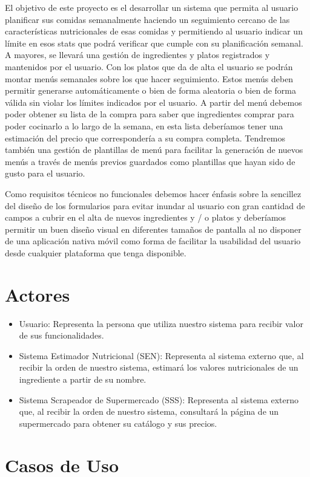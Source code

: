 \documentclass[12pt, a4paper, twoside]{book}
\begin{document}
	El objetivo de este proyecto es el desarrollar un sistema que permita al usuario planificar sus comidas semanalmente haciendo un seguimiento cercano de las características nutricionales de esas comidas y permitiendo al usuario indicar un límite en esos stats que podrá verificar que cumple con su planificación semanal.
	A mayores, se llevará una gestión de ingredientes y platos registrados y mantenidos por el usuario. Con los platos que da de alta el usuario se podrán montar menús semanales sobre los que hacer seguimiento.
	Estos menús deben permitir generarse automáticamente o bien de forma aleatoria o bien de forma válida sin violar los límites indicados por el usuario. A partir del menú debemos poder obtener su lista de la compra para saber que ingredientes comprar para poder cocinarlo a lo largo de la semana, en esta lista deberíamos tener una estimación del precio que correspondería a su compra completa.
	Tendremos también una gestión de plantillas de menú para facilitar la generación de nuevos menús a través de menús previos guardados como plantillas que hayan sido de gusto para el usuario.
	
	Como requisitos técnicos no funcionales debemos hacer énfasis sobre la sencillez del diseño de los formularios para evitar inundar al usuario con gran cantidad de campos a cubrir en el alta de nuevos ingredientes y / o platos y deberíamos permitir un buen diseño visual en diferentes tamaños de pantalla al no disponer de una aplicación nativa móvil como forma de facilitar la usabilidad del usuario desde cualquier plataforma que tenga disponible.
	\section{Actores}
	\begin{itemize}
		\item Usuario: Representa la persona que utiliza nuestro sistema para recibir valor de sus funcionalidades.
		\item Sistema Estimador Nutricional (SEN): Representa al sistema externo que, al recibir la orden de nuestro sistema, estimará los valores nutricionales de un ingrediente a partir de su nombre.
		\item Sistema Scrapeador de Supermercado (SSS): Representa al sistema externo que, al recibir la orden de nuestro sistema, consultará la página de un supermercado para obtener su catálogo y sus precios.
	\end{itemize}
	\section{Casos de Uso}
\end{document}

